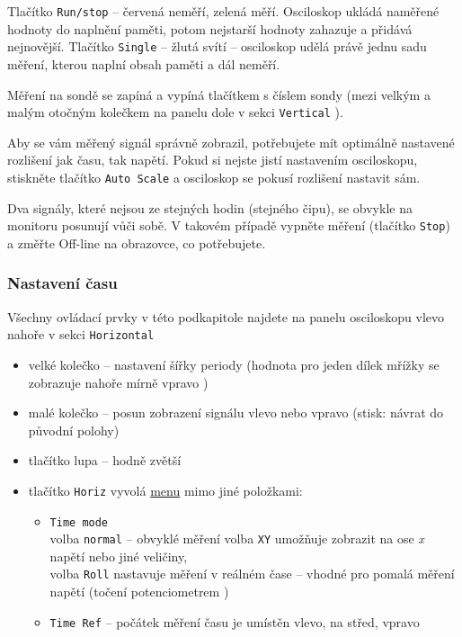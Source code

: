 Tlačítko \texttt{Run/stop} -- červená neměří, zelená měří. Osciloskop ukládá naměřené hodnoty do naplnění paměti, potom nejstarší hodnoty zahazuje a přidává nejnovější. 
Tlačítko \texttt{Single} -- žlutá svítí -- osciloskop udělá právě jednu sadu měření, kterou naplní obsah paměti a dál neměří. 

Měření na sondě se zapíná a vypíná tlačítkem s číslem sondy (mezi velkým a malým otočným kolečkem na panelu dole v sekci {\tt Vertical} ).

Aby se vám měřený signál správně zobrazil, potřebujete mít optimálně nastavené rozlišení jak času, tak napětí.
Pokud si nejste jistí  nastavením osciloskopu, stiskněte tlačítko \texttt{Auto Scale} a osciloskop se pokusí rozlišení nastavit sám. 

Dva signály, které nejsou ze stejných hodin (stejného čipu), se obvykle na monitoru posunují vůči sobě. V takovém případě vypněte 
měření (tlačítko \texttt{Stop}) a změřte Off-line na obrazovce, co potřebujete. 

\subsubsection{Nastavení času}

Všechny ovládací prvky v této podkapitole najdete na panelu osciloskopu vlevo nahoře v sekci {\tt Horizontal}

\begin{itemize}
	\item velké kolečko -- nastavení šířky periody (hodnota pro jeden dílek mřížky se zobrazuje nahoře mírně vpravo )
	\item malé kolečko -- posun zobrazení signálu vlevo nebo vpravo (stisk: návrat do původní polohy) 
	\item tlačítko lupa -- hodně zvětší %
	\item tlačítko \texttt{Horiz} vyvolá \hyperref[menu:osc]{menu} mimo jiné položkami:  %
	\begin{itemize}
		\item \texttt{Time mode} \\ 
		volba \texttt{normal}  -- obvyklé měření
		volba \texttt{XY} umožňuje zobrazit na ose \textit{x} napětí nebo jiné veličiny, \\
		volba \texttt{Roll} nastavuje měření v reálném čase -- vhodné pro pomalá měření napětí (točení potenciometrem ) 

		\item \texttt{Time Ref} -- počátek měření času je umístěn vlevo, na střed, vpravo
	\end{itemize} 	
\end{itemize}

